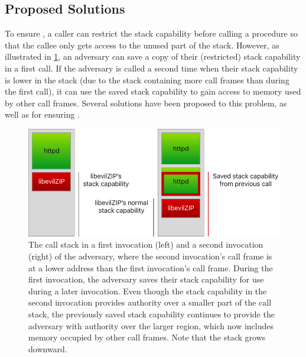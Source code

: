 \documentclass[main.tex]{subfiles}
\begin{document}
\subsection*{Proposed Solutions} 
To ensure , a caller can restrict the stack capability before calling a procedure so that the callee only gets access to the unused part of the stack. However, as illustrated in \cref{fig:savedstackcap}, an adversary can save a copy of their (restricted) stack capability in a first call. If the adversary is called a second time when their stack capability is lower in the stack (due to the stack containing more call frames than during the first call), it can use the saved stack capability to gain access to memory used by other call frames. Several solutions have been proposed to this problem, as well as for ensuring .

\begin{figure}
	\begin{center}
		\includegraphics{Images/Saved Stack Cap.pdf}
	\end{center}
	\caption{The call stack in a first invocation (left) and a second invocation (right) of the adversary, where the second invocation's call frame is at a lower address than the first invocation's call frame. During the first invocation, the adversary saves their stack capability for use during a later invocation. Even though the stack capability in the second invocation provides authority over a smaller part of the call stack, the previously saved stack capability continues to provide the adversary with authority over the larger region, which now includes memory occupied by other call frames. Note that the stack grows downward.}
	\label{fig:savedstackcap}
\end{figure}
\end{document}
